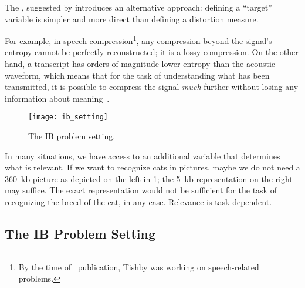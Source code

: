 The , suggested by \citeauthor{tishby:1999}\cite{tishby:1999} introduces an alternative approach: defining a ``target'' variable is simpler and more direct than defining a distortion measure.

For example, in speech compression\footnote{By the time of~\cite{tishby:1999} publication, Tishby was working on speech-related problems.}, any compression beyond the signal's entropy cannot be perfectly reconstructed; it is a lossy compression. On the other hand, a transcript has orders of magnitude lower entropy than the acoustic waveform, which means that for the task of understanding what has been transmitted, it is possible to compress the signal \emph{much} further without losing any information about meaning~\cite{tishby:1999}.

\begin{figure}
	[htb] \centering
	\texttt{[image: ib\_setting]}
	\caption{The IB problem setting.}\label{fig:ib_problem_setting}
\end{figure}

In many situations, we have access to an additional variable that determines what is relevant. If we want to recognize cats in pictures, maybe we do not need a 360~kb picture as depicted on the left in \cref{fig:ib_problem_setting}; the 5~kb representation on the right may suffice. The exact representation would not be sufficient for the task of recognizing the breed of the cat, in any case. Relevance is task-dependent.


\subsection{The IB Problem Setting}\label{ib_problem_setting}
